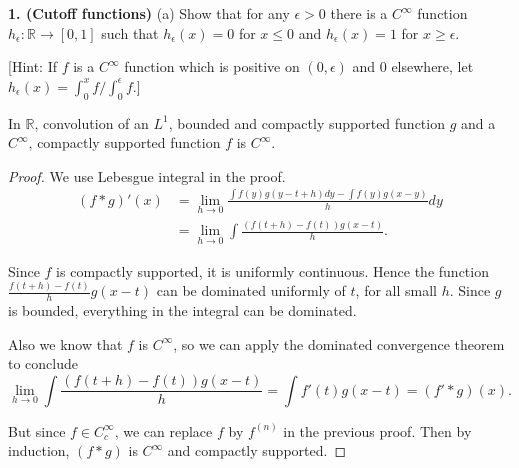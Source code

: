 
\textbf{1. (Cutoff functions)}
(a) Show that for any $\epsilon>0$ there is a $C^{\infty}$ function $h_{\epsilon}: \mathbb{R} \rightarrow[0,1]$ such that $h_{\epsilon}(x)=0$ for $x \leq 0$ and $h_{\epsilon}(x)=1$ for $x \geq \epsilon$.

[Hint: If $f$ is a $C^{\infty}$ function which is positive on $(0, \epsilon)$ and 0 elsewhere, let $h_{\epsilon}(x)=\int_{0}^{x} f / \int_{0}^{\epsilon} f$.]

\begin{lemma}
	In $\mathbb{R}$, convolution of an $L^1$, bounded and compactly supported function $g$ and a $C^\infty $, compactly supported function $f$ is $C^\infty $.
\end{lemma}
\begin{proof}
	We use Lebesgue integral in the proof.
	\begin{align*}
		(f * g)'(x)
		&= \lim_{h \to 0} \frac{\int f(y) g(y - t + h) dy - \int f(y) g(x - y)}{h}dy \\
		&= \lim_{h \to 0} \int \frac{\left(f\left( t+h \right) -f(t) \right)g(x-t)}{h}
	.\end{align*}

	Since $f$ is compactly supported, it is uniformly continuous. Hence the function $\frac{f(t+h) - f(t)}{h}g(x-t)$ can be dominated uniformly of $t$, for all small $h$. Since $g$ is bounded, everything in the integral can be dominated.

	Also we know that $f$ is $C^\infty $, so we can apply the dominated convergence theorem to conclude 
	\[
		\lim_{h \to 0} \int \frac{\left(f\left( t+h \right) -f(t) \right)g(x-t)}{h}
		= \int f'(t) g(x-t)
		= (f' * g) (x)
	.\] 

	But since $f \in C^\infty _c$, we can replace $f$ by $f^{(n)}$ in the previous proof. Then by induction, $(f * g)$ is $C^\infty $ and compactly supported.
\end{proof}

